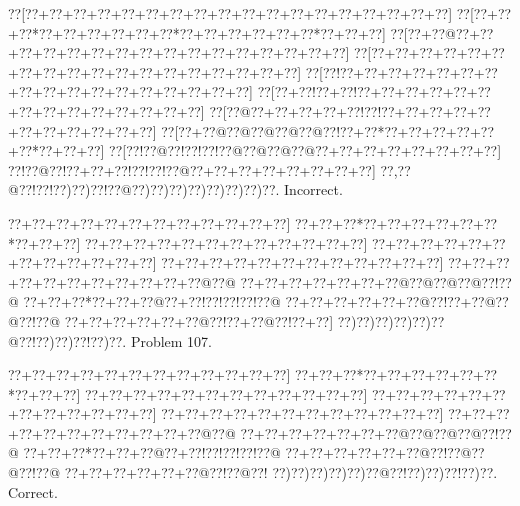 \documentclass[a5paper]{article}
\begin{document}
\begin{center}
{\goo
\0??[\0??+\0??+\0??+\0??+\0??+\0??+\0??+\0??+\0??+\0??+\0??+\0??+\0??+\0??+\0??+\0??+\0??+\0??]
\0??[\0??+\0??+\0??*\0??+\0??+\0??+\0??+\0??+\0??*\0??+\0??+\0??+\0??+\0??+\0??*\0??+\0??+\0??]
\0??[\0??+\0??@\0??+\0??+\0??+\0??+\0??+\0??+\0??+\0??+\0??+\0??+\0??+\0??+\0??+\0??+\0??+\0??]
\0??[\0??+\0??+\0??+\0??+\0??+\0??+\0??+\0??+\0??+\0??+\0??+\0??+\0??+\0??+\0??+\0??+\0??+\0??]
\0??[\0??!\0??+\0??+\0??+\0??+\0??+\0??+\0??+\0??+\0??+\0??+\0??+\0??+\0??+\0??+\0??+\0??+\0??]
\0??[\0??+\0??!\0??+\0??!\0??+\0??+\0??+\0??+\0??+\0??+\0??+\0??+\0??+\0??+\0??+\0??+\0??+\0??]
\0??[\0??@\0??+\0??+\0??+\0??+\0??!\0??!\0??+\0??+\0??+\0??+\0??+\0??+\0??+\0??+\0??+\0??+\0??]
\0??[\0??+\0??@\0??@\0??@\0??@\0??@\0??!\0??+\0??*\0??+\0??+\0??+\0??+\0??+\0??*\0??+\0??+\0??]
\0??[\0??!\0??@\0??!\0??!\0??!\0??@\0??@\0??@\0??@\0??+\0??+\0??+\0??+\0??+\0??+\0??+\0??]
\0??!\0??@\0??!\0??+\0??+\0??!\0??!\0??!\0??@\0??+\0??+\0??+\0??+\0??+\0??+\0??+\0??]
\0??,\0??@\0??!\0??!\0??)\0??)\0??!\0??@\0??)\0??)\0??)\0??)\0??)\0??)\0??)\0??.
}
Incorrect. 

\end{center}
\newpage
\begin{center}
{\goo
\0??+\0??+\0??+\0??+\0??+\0??+\0??+\0??+\0??+\0??+\0??+\0??]
\0??+\0??+\0??*\0??+\0??+\0??+\0??+\0??+\0??*\0??+\0??+\0??]
\0??+\0??+\0??+\0??+\0??+\0??+\0??+\0??+\0??+\0??+\0??+\0??]
\0??+\0??+\0??+\0??+\0??+\0??+\0??+\0??+\0??+\0??+\0??+\0??]
\0??+\0??+\0??+\0??+\0??+\0??+\0??+\0??+\0??+\0??+\0??+\0??]
\0??+\0??+\0??+\0??+\0??+\0??+\0??+\0??+\0??+\0??+\0??@\0??@
\0??+\0??+\0??+\0??+\0??+\0??+\0??@\0??@\0??@\0??@\0??!\0??@
\0??+\0??+\0??*\0??+\0??+\0??@\0??+\0??!\0??!\0??!\0??!\0??@
\0??+\0??+\0??+\0??+\0??+\0??@\0??!\0??+\0??@\0??@\0??!\0??@
\0??+\0??+\0??+\0??+\0??+\0??@\0??!\0??+\0??@\0??!\0??+\0??]
\0??)\0??)\0??)\0??)\0??)\0??@\0??!\0??)\0??)\0??!\0??)\0??.
}
Problem 107.

\end{center}
\begin{center}
{\goo
\0??+\0??+\0??+\0??+\0??+\0??+\0??+\0??+\0??+\0??+\0??+\0??]
\0??+\0??+\0??*\0??+\0??+\0??+\0??+\0??+\0??*\0??+\0??+\0??]
\0??+\0??+\0??+\0??+\0??+\0??+\0??+\0??+\0??+\0??+\0??+\0??]
\0??+\0??+\0??+\0??+\0??+\0??+\0??+\0??+\0??+\0??+\0??+\0??]
\0??+\0??+\0??+\0??+\0??+\0??+\0??+\0??+\0??+\0??+\0??+\0??]
\0??+\0??+\0??+\0??+\0??+\0??+\0??+\0??+\0??+\0??+\0??@\0??@
\0??+\0??+\0??+\0??+\0??+\0??+\0??@\0??@\0??@\0??@\0??!\0??@
\0??+\0??+\0??*\0??+\0??+\0??@\0??+\0??!\0??!\0??!\0??!\0??@
\0??+\0??+\0??+\0??+\0??+\0??@\0??!\0??@\0??@\0??!\0??@
\0??+\0??+\0??+\0??+\0??+\0??@\0??!\0??@\0??!
\0??)\0??)\0??)\0??)\0??)\0??@\0??!\0??)\0??)\0??!\0??)\0??.
}
Correct. 

\end{center}
\end{document}
